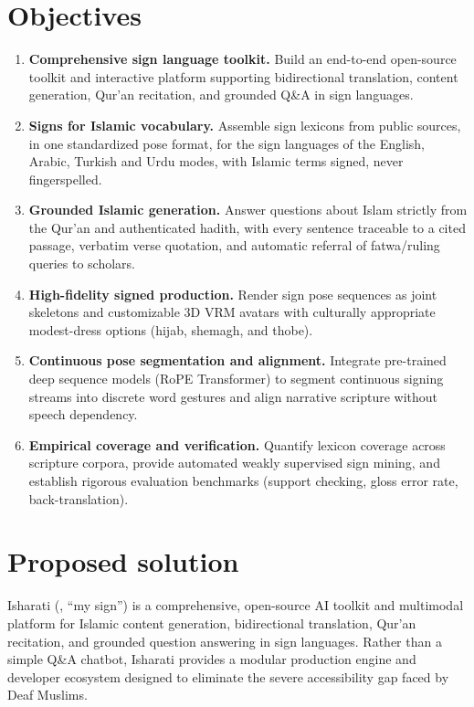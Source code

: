 \section{Objectives}
\begin{enumerate}[label=\textbf{O\arabic*.},leftmargin=*,itemsep=1pt]
  \item \textbf{Comprehensive sign language toolkit.} Build an end-to-end open-source toolkit and interactive platform supporting bidirectional translation, content generation, Qur'an recitation, and grounded Q\&A in sign languages.
  \item \textbf{Signs for Islamic vocabulary.} Assemble sign lexicons from public sources, in one standardized pose format, for the
        sign languages of the English, Arabic, Turkish and Urdu modes, with Islamic terms signed, never fingerspelled.
  \item \textbf{Grounded Islamic generation.} Answer questions about Islam strictly from the Qur'an and authenticated hadith, with every
        sentence traceable to a cited passage, verbatim verse quotation, and automatic referral of fatwa/ruling queries to scholars.
  \item \textbf{High-fidelity signed production.} Render sign pose sequences as joint skeletons and customizable 3D VRM
        avatars with culturally appropriate modest-dress options (hijab, shemagh, and thobe).
  \item \textbf{Continuous pose segmentation and alignment.} Integrate pre-trained deep sequence models (RoPE Transformer) to segment continuous signing streams into discrete word gestures and align narrative scripture without speech dependency.
  \item \textbf{Empirical coverage and verification.} Quantify lexicon coverage across scripture corpora, provide automated weakly supervised sign mining, and establish rigorous evaluation benchmarks (support checking, gloss error rate, back-translation).
\end{enumerate}

\section{Proposed solution}
Isharati (, ``my sign'') is a comprehensive, open-source AI toolkit and multimodal platform for Islamic content generation, bidirectional translation, Qur'an recitation, and grounded question answering in sign languages. Rather than a simple Q\&A chatbot, Isharati provides a modular production engine and developer ecosystem designed to eliminate the severe accessibility gap faced by Deaf Muslims.

